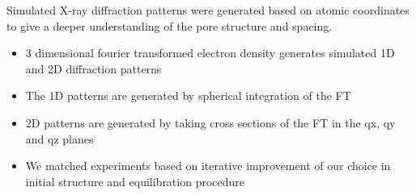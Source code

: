 \documentclass{article}
\begin{document}
	Simulated X-ray diffraction patterns were generated based on atomic coordinates to give a deeper understanding of the pore structure and spacing. 
        \begin{itemize}
               \item 3 dimensional fourier transformed electron density generates simulated 1D and 2D diffraction patterns
               \item The 1D patterns are generated by spherical integration of the FT
               \item 2D patterns are generated by taking cross sections of the FT in the qx, qy and qz planes
               \item We matched experiments based on iterative improvement of our choice in initial structure and equilibration procedure
        \end{itemize}
\end{document}
